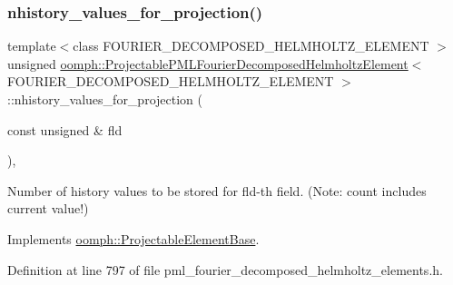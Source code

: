 \subsubsection{\texorpdfstring{nhistory\+\_\+values\+\_\+for\+\_\+projection()}{nhistory\_values\_for\_projection()}}
{\footnotesize\ttfamily template$<$class F\+O\+U\+R\+I\+E\+R\+\_\+\+D\+E\+C\+O\+M\+P\+O\+S\+E\+D\+\_\+\+H\+E\+L\+M\+H\+O\+L\+T\+Z\+\_\+\+E\+L\+E\+M\+E\+NT $>$ \\
unsigned \hyperlink{classoomph_1_1ProjectablePMLFourierDecomposedHelmholtzElement}{oomph\+::\+Projectable\+P\+M\+L\+Fourier\+Decomposed\+Helmholtz\+Element}$<$ F\+O\+U\+R\+I\+E\+R\+\_\+\+D\+E\+C\+O\+M\+P\+O\+S\+E\+D\+\_\+\+H\+E\+L\+M\+H\+O\+L\+T\+Z\+\_\+\+E\+L\+E\+M\+E\+NT $>$\+::nhistory\+\_\+values\+\_\+for\+\_\+projection (\begin{DoxyParamCaption}\item[{const unsigned \&}]{fld }\end{DoxyParamCaption})\hspace{0.3cm}{\ttfamily [inline]}, {\ttfamily [virtual]}}



Number of history values to be stored for fld-\/th field. (Note\+: count includes current value!) 



Implements \hyperlink{classoomph_1_1ProjectableElementBase_ac6790f394630b964663281f8740f43a5}{oomph\+::\+Projectable\+Element\+Base}.



Definition at line 797 of file pml\+\_\+fourier\+\_\+decomposed\+\_\+helmholtz\+\_\+elements.\+h.

\mbox{\label{classoomph_1_1ProjectablePMLFourierDecomposedHelmholtzElement_af96096d961b9611419ba010223e55d4e}} 
